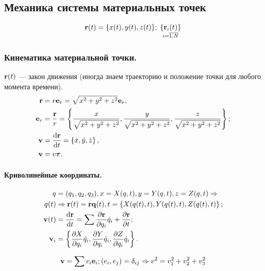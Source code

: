 \documentclass[12pt, a4paper]{article}
\begin{document}
\subsection{Механика системы материальных точек}
\begin{equation*}
\vb{r}(t) = \{x(t), y(t), z(t) \}; \thickspace \mathop{\{\vb{r}_i(t)\}}\limits_{i = \overline{1{,}N}}
\end{equation*}  

\subsubsection{Кинематика материальной точки.}
$\vb{r}(t)$ --- закон движения (иногда знаем траекторию и положение точки для любого момента времени). 
\begin{align*}
\vb{r} &= r \vb{e}_r = \sqrt{x^2 + y^2 + z^2} \vb{e}_r, \\
\vb{e}_r &= \frac{\vb{r}}{r} = \left\{ \frac{x}{\sqrt{x^2 + y^2 + z^2}}, \frac{y}{\sqrt{x^2 + y^2 + z^2}}, \frac{z}{\sqrt{x^2 + y^2 + z^2}} \right\};\\
\vb{v} &= \dv{\vb{r}}{t} = \left\{\dot x, \dot y, \dot z\right\},\\
\vb{v} &= v \vb*{\tau}.
\end{align*}

\paragraph{Криволинейные координаты.}
\begin{align*}
q &= (q_1, q_2, q_3), x =X(q, t), y = Y(q, t), z =Z(q, t) \Rightarrow \\
q(t) &\Rightarrow \vb{r}(t) = \vb{r}{\vb{q}(t), t} = \left\{X(q(t), t), Y(q(t), t), Z(q(t), t)\right\}; \\
\vb{v}(t) &= \dv{\vb{r}}{t} = \sum \pdv{\vb{r}}{q_i} \dot q_i + \pdv{\vb{r}}{t}; \\
\vb{v}_i &= \left\{\pdv{X}{q_i} \dot q_i, \pdv{Y}{q_i} \dot q_i, \pdv{Z}{q_i} \dot q_i \right\}.
\end{align*}

\begin{equation*}
\vb{v} = \sum v_i \vb{e}_i; (e_i, e_j) = \delta_{ij} \Rightarrow v^2 = v_1^2 + v_2^2 + v_3^2
\end{equation*}
\end{document}
